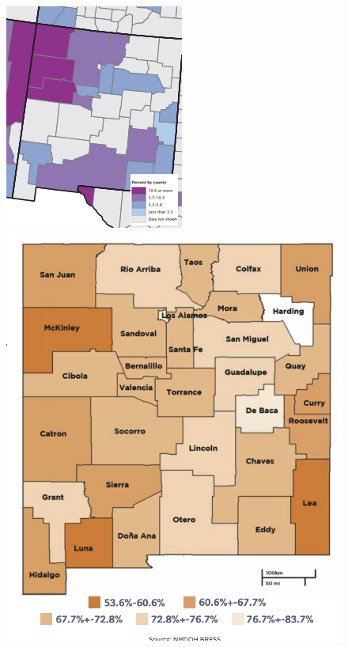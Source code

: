 \documentclass{article}
\begin{document}
{\begin{figure}
\centering
\includegraphics[scale=1.5]{multi-gen-plot}
\includegraphics[scale=.5]{access_to_healthcare-plot}

\end{figure}}
\end{document}
